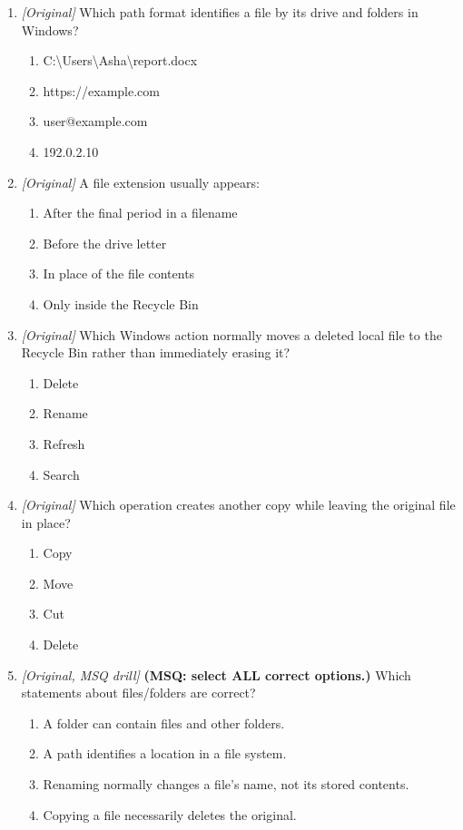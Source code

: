 \begin{enumerate}[label=\textbf{Q\arabic*.}, leftmargin=*]
\begin{enumerate}[label=\Alph*.]
    \item Emptying the Recycle Bin restores all files.
  \end{enumerate}
\item \textit{[Original]} Which path format identifies a file by its drive and folders in Windows?
  \begin{enumerate}[label=\Alph*.]
\item C:\textbackslash Users\textbackslash Asha\textbackslash report.docx
   \item https://example.com
   \item user@example.com
   \item 192.0.2.10
  \end{enumerate}

\item \textit{[Original]} A file extension usually appears:
  \begin{enumerate}[label=\Alph*.]
\item After the final period in a filename
   \item Before the drive letter
   \item In place of the file contents
   \item Only inside the Recycle Bin
  \end{enumerate}

\item \textit{[Original]} Which Windows action normally moves a deleted local file to the Recycle Bin rather than immediately erasing it?
  \begin{enumerate}[label=\Alph*.]
\item Delete
   \item Rename
   \item Refresh
   \item Search
  \end{enumerate}

\item \textit{[Original]} Which operation creates another copy while leaving the original file in place?
  \begin{enumerate}[label=\Alph*.]
\item Copy
   \item Move
   \item Cut
   \item Delete
  \end{enumerate}

\item \textit{[Original, MSQ drill]} \textbf{(MSQ: select ALL correct options.)} Which statements about files/folders are correct?
  \begin{enumerate}[label=\Alph*.]
\item A folder can contain files and other folders.
   \item A path identifies a location in a file system.
   \item Renaming normally changes a file's name, not its stored contents.
   \item Copying a file necessarily deletes the original.
  \end{enumerate}

\end{enumerate}
